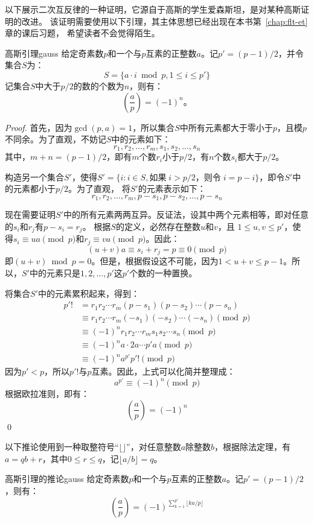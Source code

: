  以下展示二次互反律的一种证明，它源自于高斯的学生爱森斯坦，是对某种高斯证明的改进。
 该证明需要使用以下引理，其主体思想已经出现在本书第~\ref{chap:flt-et}章的课后习题，
 希望读者不会觉得陌生。
 \begin{lemma}{高斯引理}{gauss}
 给定奇素数$p$和一个与$p$互素的正整数$a$。记$p' = (p -1)/2$，并令集合$S$为：
   \[S = \{  a \cdot i \bmod p, 1 \leq i \leq p' \}\] 
记集合$S$中大于$p/2$的数的个数为$n$，则有：
  \[ \left(\frac{a}{p} \right) = (-1)^n\text{。}\]
 \end{lemma}
 
 \begin{proof}
  首先，因为$\gcd(p, a)=1$，所以集合$S$中所有元素都大于零小于$p$，且模$p$不同余。为了直观，不妨记$S$中的元素如下：
  \[r_1, r_2, \ldots, r_m, s_1, s_2, \ldots, s_n\]
 其中，$m + n = (p -1)/2$，即有$m$个数$r_i$小于$p/2$，有$n$个数$s_i$都大于$p/2$。
    
 构造另一个集合$S'$，使得$S' = \{ i:   i \in S, \text{如果}\; i > p/2 \text{，则令}\; i = p - i  \}$，即令$S'$中的元素都小于$p/2$。为了直观，
 将$S'$的元素表示如下：
 \[r_1, r_2, \ldots, r_m, p - s_1, p - s_2,\ldots, p - s_n\]
 
 现在需要证明$S'$中的所有元素两两互异。反证法，设其中两个元素相等，即对任意的$s_i$和$r_j$有$p - s_i = r_j$。
 根据$S$的定义，必然存在整数$u$和$v$，且
 $1 \leq u, v \leq p'$，使得$s_i \equiv u a \pmod{p}$和$r_j \equiv v a \pmod{p}$。因此：
 \[ (u + v) a \equiv s_i + r_j = p \equiv 0 \pmod{p}\]
 即$ ( u + v) \bmod p = 0$。但是，根据假设这不可能，因为$1 < u +  v  \leq p - 1$。所以，$S'$中的元素只是$1, 2, \ldots, p'$这$p'$个数的一种置换。
 
 将集合$S'$中的元素累积起来，得到：
 \begin{align*}
 p' ! &= r_1 r_2 \cdots r_m (p - s_1)  (p - s_2) \cdots (p - s_n) \\
        &\equiv r_1 r_2 \cdots r_m (- s_1) (- s_2) \cdots  (- s_n) \pmod{p} \\
        &\equiv (-1)^n r_1 r_2 \cdots r_m  s_1 s_2 \cdots  s_n \pmod{p} \\
        &\equiv (-1)^n a \cdot 2a \cdots p' a \pmod{p} \\
        &\equiv (-1)^n a^{p'} p'! \pmod{p}
 \end{align*}
 因为$p' < p$，所以$p' !$与$p$互素。因此，上式可以化简并整理成：
 \[ a^{p'} \equiv (-1)^n \pmod{p}\]
 根据欧拉准则，即有：
 \[ \left(\frac{a}{p} \right) = (-1)^n\]
 \qed
 \end{proof}
 
 以下推论使用到一种取整符号“$\lfloor \rfloor$”，对任意整数$a$除整数$b$，根据除法定理，有$a = qb + r$，其中$0 \leq r \leq q$，记$\lfloor a/b\rfloor  = q$。
 \begin{corollary}{高斯引理的推论}{gauss}
  给定奇素数$p$和一个与$p$互素的正整数$a$。记$p' = (p-1)/2$，则有：
   \[ \left(\frac{a}{p} \right) = (-1)^{\sum_{k = 1}^{p'} \lfloor ka/p\rfloor}\]
  \end{corollary}
  
